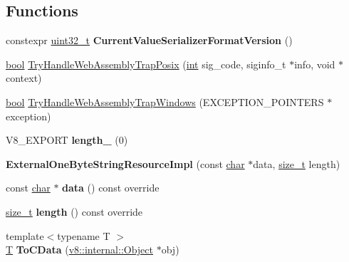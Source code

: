 \subsection*{Functions}
\begin{DoxyCompactItemize}
\item 
\mbox{\label{namespacev8_ad313789859cb91887fa3f85d2339827f}} 
constexpr \mbox{\hyperlink{classuint32__t}{uint32\+\_\+t}} {\bfseries Current\+Value\+Serializer\+Format\+Version} ()
\item 
\mbox{\hyperlink{classbool}{bool}} \mbox{\hyperlink{namespacev8_a801e3a2af23e3fdef8b4a728bccbcccf}{Try\+Handle\+Web\+Assembly\+Trap\+Posix}} (\mbox{\hyperlink{classint}{int}} sig\+\_\+code, siginfo\+\_\+t $\ast$info, void $\ast$context)
\item 
\mbox{\hyperlink{classbool}{bool}} \mbox{\hyperlink{namespacev8_a3686a31962558f552b86653f59e774dd}{Try\+Handle\+Web\+Assembly\+Trap\+Windows}} (E\+X\+C\+E\+P\+T\+I\+O\+N\+\_\+\+P\+O\+I\+N\+T\+E\+RS $\ast$exception)
\item 
\mbox{\label{namespacev8_a3316a460f8c1b1c26ef1502672a45d82}} 
V8\+\_\+\+E\+X\+P\+O\+RT {\bfseries length\+\_\+} (0)
\item 
\mbox{\label{namespacev8_a4dbc856eb5646ff38552425289662910}} 
{\bfseries External\+One\+Byte\+String\+Resource\+Impl} (const \mbox{\hyperlink{classchar}{char}} $\ast$data, \mbox{\hyperlink{classsize__t}{size\+\_\+t}} length)
\item 
\mbox{\label{namespacev8_a986ddc1d3d9ae9f1dbd856769c69af09}} 
const \mbox{\hyperlink{classchar}{char}} $\ast$ {\bfseries data} () const override
\item 
\mbox{\label{namespacev8_aefdae7ce6c1c58d9a7b6a55a498ca134}} 
\mbox{\hyperlink{classsize__t}{size\+\_\+t}} {\bfseries length} () const override
\item 
\mbox{\label{namespacev8_a2ac0c934ca271579de66b77191276949}} 
{\footnotesize template$<$typename T $>$ }\\\mbox{\hyperlink{classv8_1_1internal_1_1torque_1_1T}{T}} {\bfseries To\+C\+Data} (\mbox{\hyperlink{classv8_1_1internal_1_1Object}{v8\+::internal\+::\+Object}} $\ast$obj)
\item 

\end{DoxyCompactItemize}
